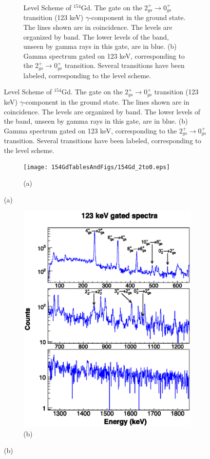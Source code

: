 \begin{landscape}
\begin{figure}[!]
    \centering
    \label{fig:154_2to0}
    \begin{subfigure}{1.4\textwidth}
    \caption{\centering \fontsize{10pt}{12pt}Level Scheme of $^{154}$Gd. The gate on the $2_{gs}^+\rightarrow 0_{gs}^+$ transition (123 keV) $\gamma$-component in the ground state. The lines shown are in coincidence. The levels are organized by band. The lower levels of the band, unseen by gamma rays in this gate, are in blue. (b) Gamma spectrum gated on 123 keV, corresponding to the $2_{gs}^+\rightarrow 0_{gs}^+$ transition. Several transitions have been labeled, corresponding to the level scheme.}
    \end{subfigure}
\end{figure}
\clearpage
\begin{figure}
    \ContinuedFloat
    \begin{subfigure}{1.4\textwidth}
    \texttt{[image: 154GdTablesAndFigs/154Gd\_2to0.eps]}
    \caption*{(a)}
    \label{fig:154_2to0level}
    \end{subfigure}
    \end{figure}
    \end{landscape}
    \begin{figure}
    \ContinuedFloat
    \begin{subfigure}{\textwidth}
    \includegraphics[scale=1.3]{154GdTablesAndFigs/123_gamma.eps}
    \caption*{(b)}
    \label{fig:154_2to0spec}
    \end{subfigure}
\end{figure}